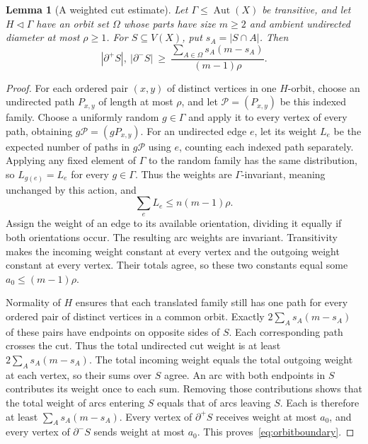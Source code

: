 \documentclass[11pt,a4paper,reqno]{amsart}
\newtheorem{lemma}[theorem]{Lemma}
\theoremstyle{definition}
\theoremstyle{remark}
\numberwithin{equation}{section}
\DeclareMathOperator{\Aut}{Aut}
\begin{document}
\begin{lemma}[A weighted cut estimate]\label{lem:directed-expansion}
Let $\Gamma\le\Aut(X)$ be transitive, and let $H\lhd\Gamma$ have an orbit set $\Omega$ whose parts have size $m\ge2$ and ambient undirected diameter at most $\rho\ge1$. For $S\subseteq V(X)$, put $s_A=|S\cap A|$. Then
\begin{equation}\label{eq:orbitboundary}
 |\partial^+S|,\ |\partial^-S|
 \ \ge\ \frac{\sum_{A\in\Omega}s_A(m-s_A)}{(m-1)\rho}.
\end{equation}
\end{lemma}
\begin{proof}
For each ordered pair $(x,y)$ of distinct vertices in one $H$-orbit, choose an undirected path $P_{x,y}$ of length at most $\rho$, and let $\mathcal P=(P_{x,y})$ be this indexed family. Choose a uniformly random $g\in\Gamma$ and apply it to every vertex of every path, obtaining $g\mathcal P=(gP_{x,y})$. For an undirected edge $e$, let its weight $L_e$ be the expected number of paths in $g\mathcal P$ using $e$, counting each indexed path separately. Applying any fixed element of $\Gamma$ to the random family has the same distribution, so $L_{g(e)}=L_e$ for every $g\in\Gamma$. Thus the weights are $\Gamma$-invariant, meaning unchanged by this action, and
\[
 \sum_e L_e\le n(m-1)\rho.
\]
Assign the weight of an edge to its available orientation, dividing it equally if both orientations occur. The resulting arc weights are invariant. Transitivity makes the incoming weight constant at every vertex and the outgoing weight constant at every vertex. Their totals agree, so these two constants equal some $a_0\le(m-1)\rho$.

Normality of $H$ ensures that each translated family still has one path for every ordered pair of distinct vertices in a common orbit. Exactly $2\sum_A s_A(m-s_A)$ of these pairs have endpoints on opposite sides of $S$. Each corresponding path crosses the cut. Thus the total undirected cut weight is at least $2\sum_A s_A(m-s_A)$. The total incoming weight equals the total outgoing weight at each vertex, so their sums over $S$ agree. An arc with both endpoints in $S$ contributes its weight once to each sum. Removing those contributions shows that the total weight of arcs entering $S$ equals that of arcs leaving $S$. Each is therefore at least $\sum_A s_A(m-s_A)$. Every vertex of $\partial^+S$ receives weight at most $a_0$, and every vertex of $\partial^-S$ sends weight at most $a_0$. This proves~\eqref{eq:orbitboundary}.

\end{proof}
\end{document}
